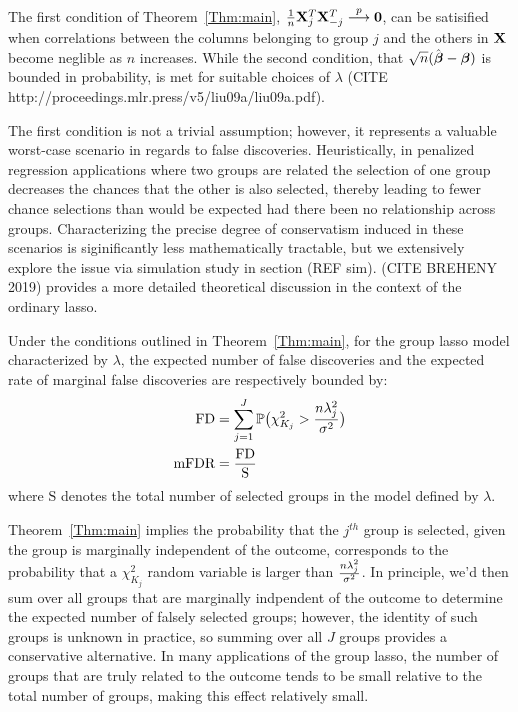 The first condition of Theorem~\ref{Thm:main}, $\tfrac{1}{n}\mathbf{X}_j^T \mathbf{X}_{-j}^T \overset{p}{\longrightarrow} \mathbf{0}$, can be satisified when correlations between the columns belonging to group $j$ and the others in $\mathbf{X}$ become neglible as $n$ increases. While the second condition, that $\sqrt{n}(\hat{\boldsymbol{\beta}} -  \boldsymbol{\beta})$ is bounded in probability, is met for suitable choices of $\lambda$ (CITE http://proceedings.mlr.press/v5/liu09a/liu09a.pdf).   

The first condition is not a trivial assumption; however, it represents a valuable worst-case scenario in regards to false discoveries.  Heuristically, in penalized regression applications where two groups are related the selection of one group decreases the chances that the other is also selected, thereby leading to fewer chance selections than would be expected had there been no relationship across groups.  Characterizing the precise degree of conservatism induced in these scenarios is siginificantly less mathematically tractable, but we extensively explore the issue via simulation study in section (REF sim).  (CITE BREHENY 2019) provides a more detailed theoretical discussion in the context of the ordinary lasso.

\begin{clry}
Under the conditions outlined in Theorem~\ref{Thm:main}, for the group lasso model characterized by $\lambda$, the expected number of false discoveries and the expected rate of marginal false discoveries are respectively bounded by:
\begin{align}
  \label{eq:Mfdr}
  \begin{alignedat}{2}
\textrm{FD} &= \sum_{j = 1}^{J} \mathbb{P} \big(\chi^2_{K_j} > \frac{n\lambda_j^2}{\sigma^2}\big)\\
\textrm{mFDR}  &= \frac{\textrm{FD}}{\text{S}} 
  \end{alignedat}
\end{align}
where $\text{S}$ denotes the total number of selected groups in the model defined by $\lambda$.
\end{clry}

Theorem~\ref{Thm:main} implies the probability that the $j^{th}$ group is selected, given the group is marginally independent of the outcome, corresponds to the probability that a $\chi^2_{K_j}$ random variable is larger than $\frac{n\lambda_j^2}{\sigma^2}$.  In principle, we'd then sum over all groups that are marginally indpendent of the outcome to determine the expected number of falsely selected groups; however, the identity of such groups is unknown in practice, so summing over all $J$ groups provides a conservative alternative.  In many applications of the group lasso, the number of groups that are truly related to the outcome tends to be small relative to the total number of groups, making this effect relatively small.


